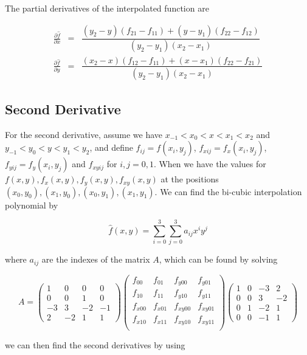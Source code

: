 The partial derivatives of the  interpolated function are

$$
\begin{array}{lcl} 
    \frac{\partial\hat{f}}{\partial x} & = & \dfrac{(y_2-y)(f_{21}-f_{11}) + (y-y_1)(f_{22}- f_{12})}{(y_2-y_1)(x_2-x_1)} \\
    \frac{\partial\hat{f}}{\partial y} & = & \dfrac{(x_2-x)(f_{12}-f_{11}) + (x-x_1)(f_{22}-f_{21})}{(y_2-y_1)(x_2-x_1)}
\end{array}
$$

\subsection{Second Derivative}
\label{subsec: second derivative}
For the second derivative, assume we have $x_{-1} < x_0 < x < x_1 < x_2$ and $y_{-1} < y_0 < y < y_1 < y_2$, and define $f_{ij} = f(x_i, y_j)$, $f_{xij} = f_x(x_i,y_j)$, $f_{yij} = f_y(x_i,y_j)$ and $f_{xyij}$ for $i,j = 0, 1$. When we have the values for $f(x,y), f_x(x,y), f_y(x,y), f_{xy}(x,y)$ at the positions $(x_0, y_0), (x_1, y_0), (x_0, y_1), (x_1, y_1)$. We can find the bi-cubic interpolation polynomial by

$$
\hat{f}(x,y) = \sum_{i=0}^3 \sum_{j=0}^3 a_{ij}x^i y^j
$$

where $a_{ij}$ are the indexes of the matrix $A$, which can be found by solving

$$
A = \begin{pmatrix}
    1&0&0&0 \\
    0&0&1&0 \\
    -3&3&-2&-1 \\
    2&-2&1&1
\end{pmatrix} \begin{pmatrix}
    f_{00}&f_{01}&f_{y00}&f_{y01} \\
    f_{10}&f_{11}&f_{y10}&f_{y11} \\
    f_{x00}&f_{x01}&f_{xy00}&f_{xy01} \\
    f_{x10}&f_{x11}&f_{xy10}&f_{xy11} \\
\end{pmatrix} \begin{pmatrix}
    1&0&-3&2 \\
    0&0&3&-2 \\
    0&1&-2&1 \\
    0&0&-1&1
\end{pmatrix}
$$


we can then find the second derivatives by using


